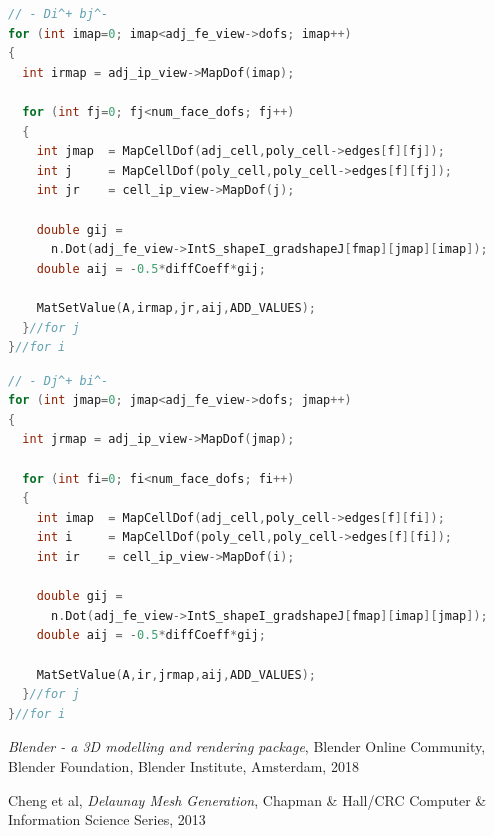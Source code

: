 \documentclass[11pt,letterpaper,titlepage]{article}
\numberwithin{equation}{section}
\begin{document}
\vspace{0.25cm}
\begin{lstlisting}[language=c++]
// - Di^+ bj^-
for (int imap=0; imap<adj_fe_view->dofs; imap++)
{
  int irmap = adj_ip_view->MapDof(imap);

  for (int fj=0; fj<num_face_dofs; fj++)
  {
    int jmap  = MapCellDof(adj_cell,poly_cell->edges[f][fj]);
    int j     = MapCellDof(poly_cell,poly_cell->edges[f][fj]);
    int jr    = cell_ip_view->MapDof(j);

    double gij =
      n.Dot(adj_fe_view->IntS_shapeI_gradshapeJ[fmap][jmap][imap]);
    double aij = -0.5*diffCoeff*gij;

    MatSetValue(A,irmap,jr,aij,ADD_VALUES);
  }//for j
}//for i
\end{lstlisting}

\vspace{0.25cm}
\begin{lstlisting}[language=c++]
// - Dj^+ bi^-
for (int jmap=0; jmap<adj_fe_view->dofs; jmap++)
{
  int jrmap = adj_ip_view->MapDof(jmap);

  for (int fi=0; fi<num_face_dofs; fi++)
  {
    int imap  = MapCellDof(adj_cell,poly_cell->edges[f][fi]);
    int i     = MapCellDof(poly_cell,poly_cell->edges[f][fi]);
    int ir    = cell_ip_view->MapDof(i);

    double gij =
      n.Dot(adj_fe_view->IntS_shapeI_gradshapeJ[fmap][imap][jmap]);
    double aij = -0.5*diffCoeff*gij;

    MatSetValue(A,ir,jrmap,aij,ADD_VALUES);
  }//for j
}//for i
\end{lstlisting}

\newpage
{}
\begin{thebibliography}{1}
    
     {\em Blender - a 3D modelling and rendering package}, Blender Online Community, Blender Foundation, Blender Institute, Amsterdam, 2018
    
     Cheng et al, {\em Delaunay Mesh Generation}, Chapman \& Hall/CRC Computer \& Information Science Series, 2013
    
    
\end{thebibliography}
\end{document}
